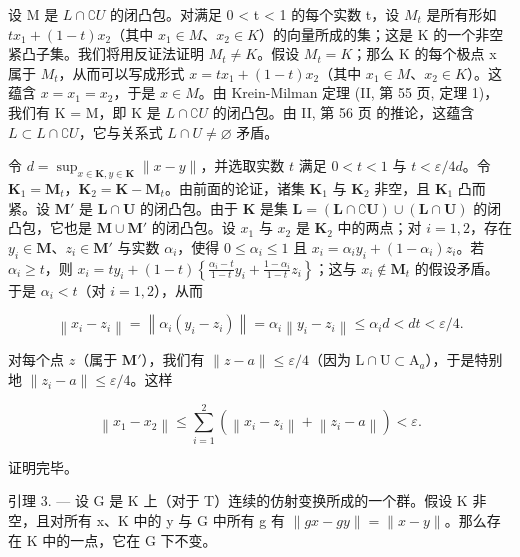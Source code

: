 设 M 是 \(L \cap \complement U\) 的闭凸包。对满足 0 \textless{} t \textless{} 1 的每个实数 t，设 \(M_{t}\) 是所有形如 \(tx_{1} + (1 - t)x_{2}\)（其中 \(x_{1} \in M\)、\(x_{2} \in K\)）的向量所成的集；这是 K 的一个非空紧凸子集。我们将用反证法证明 \(M_{t} \neq K\)。假设 \(M_{t} = K\)；那么 K 的每个极点 x 属于 \(M_{t}\)，从而可以写成形式 \(x = tx_{1} + (1 - t)x_{2}\)（其中 \(x_{1} \in M\)、\(x_{2} \in K\)）。这蕴含 \(x = x_{1} = x_{2}\)，于是 \(x \in M\)。由 Krein-Milman 定理 (II, 第 55 页, 定理 1)，我们有 K = M，即 K 是 \(L \cap \complement U\) 的闭凸包。由 II, 第 56 页 的推论，这蕴含 \(L \subset L \cap \complement U\)，它与关系式 \(L \cap U \neq \varnothing\) 矛盾。

令 \(d = \sup_{x \in \mathbf{K}, y \in \mathbf{K}} \| x - y \|\)，并选取实数 \(t\) 满足 \(0 < t < 1\) 与 \(t < \varepsilon / 4d\)。令 \(\mathbf{K}_1 = \mathbf{M}_t\)，\(\mathbf{K}_2 = \mathbf{K} - \mathbf{M}_t\)。由前面的论证，诸集 \(\mathbf{K}_1\) 与 \(\mathbf{K}_2\) 非空，且 \(\mathbf{K}_1\) 凸而紧。设 \(\mathbf{M}'\) 是 \(\mathbf{L} \cap \mathbf{U}\) 的闭凸包。由于 \(\mathbf{K}\) 是集 \(\mathbf{L} = (\mathbf{L} \cap \complement \mathbf{U}) \cup (\mathbf{L} \cap \mathbf{U})\) 的闭凸包，它也是 \(\mathbf{M} \cup \mathbf{M}'\) 的闭凸包。设 \(x_1\) 与 \(x_2\) 是 \(\mathbf{K}_2\) 中的两点；对 \(i = 1, 2\)，存在 \(y_i \in \mathbf{M}\)、\(z_i \in \mathbf{M}'\) 与实数 \(\alpha_i\)，使得 \(0 \leqslant \alpha_i \leqslant 1\) 且 \(x_i = \alpha_i y_i + (1 - \alpha_i) z_i\)。若 \(\alpha_i \geqslant t\)，则 \(x_i = ty_i + (1 - t) \left\{\frac{\alpha_i - t}{1 - t} y_i + \frac{1 - \alpha_i}{1 - t} z_i\right\}\)；这与 \(x_i \notin \mathbf{M}_t\) 的假设矛盾。于是 \(\alpha_i < t\)（对 \(i = 1, 2\)），从而

\[
\left\| x _ {i} - z _ {i} \right\| = \left\| \alpha_ {i} \left(y _ {i} - z _ {i}\right) \right\| = \alpha_ {i} \left\| y _ {i} - z _ {i} \right\| \leqslant \alpha_ {i} d <   d t <   \varepsilon / 4.
\]

对每个点 \(z\)（属于 \(\mathbf{M}'\)），我们有 \(\| z - a \| \leqslant \varepsilon / 4\)（因为 \(\mathrm{L} \cap \mathrm{U} \subset \mathrm{A}_a\)），于是特别地 \(\| z_i - a \| \leqslant \varepsilon / 4\)。这样

\[
\left\| x _ {1} - x _ {2} \right\| \leqslant \sum_ {i = 1} ^ {2} \left(\left\| x _ {i} - z _ {i} \right\| + \left\| z _ {i} - a \right\|\right) <   \varepsilon .
\]

证明完毕。

引理 3. --- 设 G 是 K 上（对于 T）连续的仿射变换所成的一个群。假设 K 非空，且对所有 x、K 中的 y 与 G 中所有 g 有 \(\|gx - gy\| = \|x - y\|\)。那么存在 K 中的一点，它在 G 下不变。

